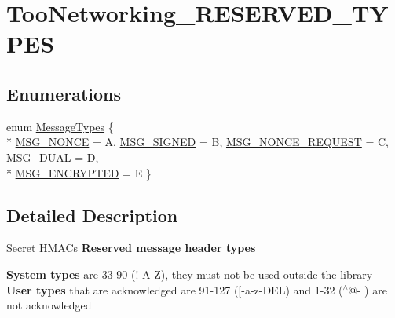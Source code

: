 \hypertarget{group__TooNetworking__RESERVED__TYPES}{}\section{Too\+Networking\+\_\+\+R\+E\+S\+E\+R\+V\+E\+D\+\_\+\+T\+Y\+P\+ES}
\label{group__TooNetworking__RESERVED__TYPES}
\subsection*{Enumerations}
\begin{DoxyCompactItemize}
\item 
enum \hyperlink{group__TooNetworking__RESERVED__TYPES_ga8a71ab4395ca4331fc50559eb1127e76}{Message\+Types} \{ \\*
\hyperlink{group__TooNetworking__RESERVED__TYPES_gga8a71ab4395ca4331fc50559eb1127e76ad5c46e5b7ec0dba6e94d65bc86858d7c}{M\+S\+G\+\_\+\+N\+O\+N\+CE} = \textquotesingle{}A\textquotesingle{}, 
\hyperlink{group__TooNetworking__RESERVED__TYPES_gga8a71ab4395ca4331fc50559eb1127e76a8d265ec37da8534c760f2fee6a8c64fb}{M\+S\+G\+\_\+\+S\+I\+G\+N\+ED} = \textquotesingle{}B\textquotesingle{}, 
\hyperlink{group__TooNetworking__RESERVED__TYPES_gga8a71ab4395ca4331fc50559eb1127e76a97fc08aa67e7764cea7da63a1f79337a}{M\+S\+G\+\_\+\+N\+O\+N\+C\+E\+\_\+\+R\+E\+Q\+U\+E\+ST} = \textquotesingle{}C\textquotesingle{}, 
\hyperlink{group__TooNetworking__RESERVED__TYPES_gga8a71ab4395ca4331fc50559eb1127e76a972f68fcfa03e7af55204cd68d7049ea}{M\+S\+G\+\_\+\+D\+U\+AL} = \textquotesingle{}D\textquotesingle{}, 
\\*
\hyperlink{group__TooNetworking__RESERVED__TYPES_gga8a71ab4395ca4331fc50559eb1127e76ae4de076a3523014f7456aecbd1a4022c}{M\+S\+G\+\_\+\+E\+N\+C\+R\+Y\+P\+T\+ED} = \textquotesingle{}E\textquotesingle{}
 \}
\end{DoxyCompactItemize}


\subsection{Detailed Description}
Secret H\+M\+A\+Cs {\bfseries Reserved message header types}

{\bfseries System types} are 33-\/90 (\textquotesingle{}!\textquotesingle{}-\/A\textquotesingle{}-\/\textquotesingle{}Z\textquotesingle{}), they must not be used outside the library~\newline
 {\bfseries User types} that are acknowledged are 91-\/127 (\textquotesingle{}\mbox{[}\textquotesingle{}-\/\textquotesingle{}a\textquotesingle{}-\/\textquotesingle{}z\textquotesingle{}-\/\textquotesingle{}D\+EL\textquotesingle{}) and 1-\/32 (\textquotesingle{}$^\wedge$@\textquotesingle{}-\/\textquotesingle{} \textquotesingle{}) are not acknowledged~\newline
 

